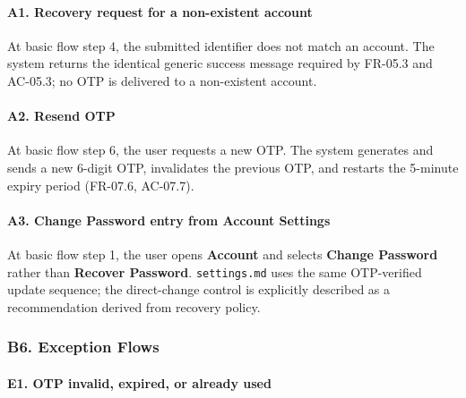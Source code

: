 \documentclass[12pt]{article}
\begin{document}
\hypertarget{sec:a1-recovery-request-for-a-non-existent-account}{}
\paragraph*{A1. Recovery request for a non-existent account}
\par\medskip

At basic flow step 4, the submitted identifier does not match an account. The system returns the identical generic success message required by FR-05.3 and AC-05.3; no OTP is delivered to a non-existent account.
\par\medskip

\hypertarget{sec:a2-resend-otp}{}
\paragraph*{A2. Resend OTP}
\par\medskip

At basic flow step 6, the user requests a new OTP. The system generates and sends a new 6-digit OTP, invalidates the previous OTP, and restarts the 5-minute expiry period (FR-07.6, AC-07.7).
\par\medskip

\hypertarget{sec:a3-change-password-entry-from-account-settings}{}
\paragraph*{A3. Change Password entry from Account Settings}
\par\medskip

At basic flow step 1, the user opens \textbf{Account} and selects \textbf{Change Password} rather than \textbf{Recover Password}. \texttt{settings.md} uses the same OTP-verified update sequence; the direct-change control is explicitly described as a recommendation derived from recovery policy.
\par\medskip

\hypertarget{sec:b6-exception-flows}{}
\subsubsection*{B6. Exception Flows}
\par\medskip

\hypertarget{sec:e1-otp-invalid-expired-or-already-used}{}
\paragraph*{E1. OTP invalid, expired, or already used}
\par\medskip
\end{document}
